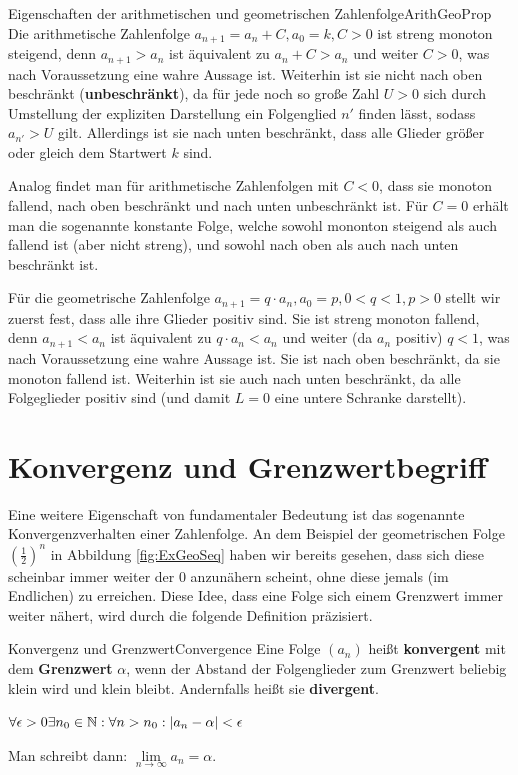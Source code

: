 \begin{example}{Eigenschaften der arithmetischen und geometrischen Zahlenfolge}{ArithGeoProp}
	Die arithmetische Zahlenfolge $a_{n+1} = a_n + C, a_0 = k, C > 0$ ist streng monoton steigend, denn $a_{n+1} > a_n$ ist äquivalent zu $a_n + C > a_n$ und weiter $C > 0$, was nach Voraussetzung eine wahre Aussage ist. Weiterhin ist sie nicht nach oben beschränkt (\textbf{unbeschränkt}), da für jede noch so große Zahl $U > 0$ sich durch Umstellung der expliziten Darstellung ein Folgenglied $n'$ finden lässt, sodass $a_{n'} > U$ gilt. Allerdings ist sie nach unten beschränkt, dass alle Glieder größer oder gleich dem Startwert $k$ sind.

	Analog findet man für arithmetische Zahlenfolgen mit $C<0$, dass sie monoton fallend, nach oben beschränkt und nach unten unbeschränkt ist. Für $C=0$ erhält man die sogenannte konstante Folge, welche sowohl mononton steigend als auch fallend ist (aber nicht streng), und sowohl nach oben als auch nach unten beschränkt ist.

	Für die geometrische Zahlenfolge $a_{n+1} = q \cdot a_n, a_0 = p, 0 < q < 1, p > 0$ stellt wir zuerst fest, dass alle ihre Glieder positiv sind. Sie ist streng monoton fallend, denn $a_{n+1} < a_n$ ist äquivalent zu $q \cdot a_n < a_n$ und weiter (da $a_n$ positiv) $q < 1$, was nach Voraussetzung eine wahre Aussage ist. Sie ist nach oben beschränkt, da sie monoton fallend ist. Weiterhin ist sie auch nach unten beschränkt, da alle Folgeglieder positiv sind (und damit $L=0$ eine untere Schranke darstellt).
\end{example}

\section{Konvergenz und Grenzwertbegriff}

Eine weitere Eigenschaft von fundamentaler Bedeutung ist das sogenannte Konvergenzverhalten einer Zahlenfolge. An dem Beispiel der geometrischen Folge $(\frac{1}{2})^n$ in Abbildung \ref{fig:ExGeoSeq} haben wir bereits gesehen, dass sich diese scheinbar immer weiter der $0$ anzunähern scheint, ohne diese jemals (im Endlichen) zu erreichen. Diese Idee, dass eine Folge sich einem Grenzwert immer weiter nähert, wird durch die folgende Definition präzisiert.

\begin{definition}{Konvergenz und Grenzwert}{Convergence}
	Eine Folge $(a_n)$ heißt \textbf{konvergent} mit dem \textbf{Grenzwert} $\alpha$, wenn der Abstand der Folgenglieder zum Grenzwert beliebig klein wird und klein bleibt. Andernfalls heißt sie \textbf{divergent}.

	$\forall \epsilon > 0 \exists n_0\in\mathbb{N}: \forall n > n_0 : |a_n - \alpha| < \epsilon$

	Man schreibt dann: $\lim\limits_{n\to\infty} a_n = \alpha$.
\end{definition}

